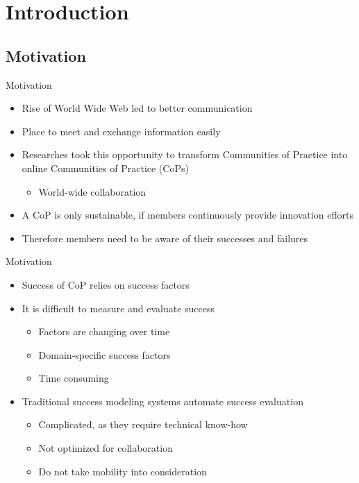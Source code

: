 \section{Introduction}

\subsection{Motivation}


\begin{frame}{Motivation}
  \begin{itemize}
    \item Rise of World Wide Web led to better communication
    \item Place to meet and exchange information easily
    \item Researches took this opportunity to transform Communities of Practice into online Communities of Practice (CoPs)
          \begin{itemize}
            \item World-wide collaboration
          \end{itemize}
    \item A CoP is only sustainable, if members continuously provide innovation efforts \cite{RKJa15}
    \item Therefore members need to be aware of their successes and failures
  \end{itemize}

\end{frame}

\begin{frame}{Motivation}
  \begin{itemize}
    \item Success of CoP relies on success factors
    \item It is difficult to measure and evaluate success
          \begin{itemize}
            \item Factors are changing over time \cite{Renz08}
            \item Domain-specific success factors
            \item Time consuming
          \end{itemize}
    \item Traditional success modeling systems automate success evaluation
          \begin{itemize}
            \item Complicated, as they require technical know-how
            \item Not optimized for collaboration
            \item Do not take mobility into consideration \cite{Renz08}
          \end{itemize}
  \end{itemize}
\end{frame}

